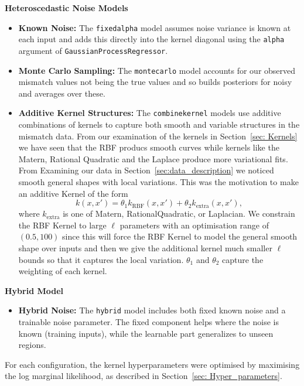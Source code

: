 \documentclass[12pt]{article}
\begin{document}
\noindent
\textbf{Heteroscedastic Noise Models}
\begin{itemize}
    \item \textbf{Known Noise:} The \texttt{fixedalpha} model assumes noise variance is known at each input and adds this directly into the kernel diagonal using the \texttt{alpha} argument of \texttt{GaussianProcessRegressor}.
    \item \textbf{Monte Carlo Sampling:} The \texttt{montecarlo} model accounts for our observed mismatch values not being the true values and so builds posteriors for noisy and averages over these. 
    \item \textbf{Additive Kernel Structures:} The \texttt{combinekernel} models use additive combinations of kernels to capture both smooth and variable structures in the mismatch data. From our examination of the kernels in Section~\ref{sec: Kernels} we have seen that the RBF producs smooth curves while kernels like the Matern, Rational Quadratic and the Laplace produce more variational fits.
            From Examining our data in Section~\ref{sec:data_description} we noticed smooth general shapes with local variations. This was the motivation to make an additive Kernel of the form 
    \begin{equation}
        k(x, x') = \theta_1k_{\mathrm{RBF}}(x, x') + \theta_2k_{\mathrm{extra}}(x, x'),
    \end{equation}
    where \(k_{\mathrm{extra}}\) is one of Matern, RationalQuadratic, or Laplacian. We constrain the RBF Kernel to large \(\ell\) parameters with an optimisation range of \((0.5,100)\) since this will force the RBF Kernel to model the general smooth shape over inputs
    and then we give the additional kernel much smaller \(\ell\) bounds so that it captures the local variation. \(\theta_1\) and \(\theta_2\) capture the weighting of each kernel.
\end{itemize}
%
%

\noindent
\textbf{Hybrid Model}
\begin{itemize}
    \item \textbf{Hybrid Noise:} The \texttt{hybrid} model includes both fixed known noise and a trainable noise parameter. The fixed component helps where the noise is known (training inputs), while the learnable part generalizes to unseen regions.
\end{itemize}
%
For each configuration, the kernel hyperparameters were optimised by maximising the log marginal likelihood, as described in Section~\ref{sec: Hyper_parameters}.
%
%
%
\end{document}
